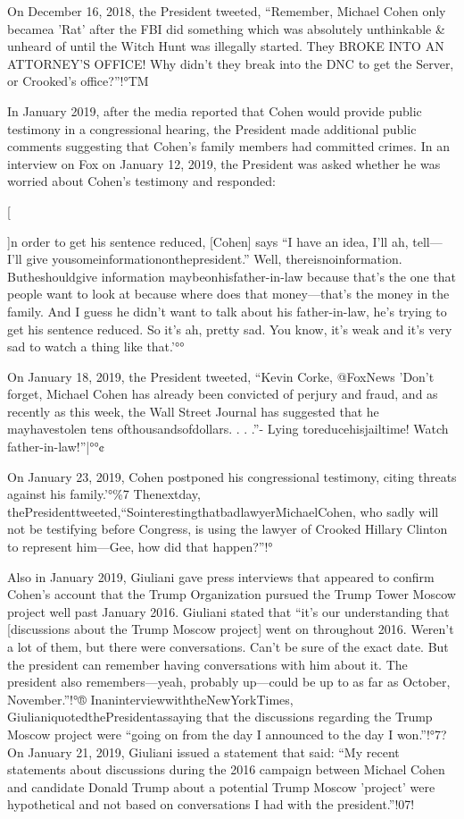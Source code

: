 On December 16, 2018, the President tweeted, “Remember, Michael Cohen only becamea 'Rat' after the FBI did something which was absolutely unthinkable \& unheard of until the Witch Hunt was illegally started.
They BROKE INTO AN ATTORNEY'S OFFICE!
Why didn't they break into the DNC to get the Server, or Crooked's office?”!°TM

In January 2019, after the media reported that Cohen would provide public testimony in a congressional hearing, the President made additional public comments suggesting that Cohen's family members had committed crimes.
In an interview on Fox on January 12, 2019, the President was asked whether he was worried about Cohen's testimony and responded:

[{]n order to get his sentence reduced, [Cohen] says “I have an idea, I'll ah, tell—I'll give yousomeinformationonthepresident.”
Well, thereisnoinformation.
Butheshouldgive information maybeonhisfather-in-law because that's the one that people want to look at because where does that money—that's the money in the family.
And I guess he didn't want to talk about his father-in-law, he's trying to get his sentence reduced.
So it's ah, pretty sad.
You know, it's weak and it's very sad to watch a thing like that.'°°

On January 18, 2019, the President tweeted, “Kevin Corke, @FoxNews 'Don't forget, Michael Cohen has already been convicted of perjury and fraud, and as recently as this week, the Wall Street Journal has suggested that he mayhavestolen tens ofthousandsofdollars. . . .”- Lying toreducehisjailtime! Watch father-in-law!”|°°¢

On January 23, 2019, Cohen postponed his congressional testimony, citing threats against his family.'°\%7
Thenextday, thePresidenttweeted,“SointerestingthatbadlawyerMichaelCohen, who sadly will not be testifying before Congress, is using the lawyer of Crooked Hillary Clinton to represent him—Gee, how did that happen?”!°%

Also in January 2019, Giuliani gave press interviews that appeared to confirm Cohen's account that the Trump Organization pursued the Trump Tower Moscow project well past January 2016.
Giuliani stated that “it's our understanding that [discussions about the Trump Moscow project] went on throughout 2016.
Weren't a lot of them, but there were conversations.
Can't be sure of the exact date.
But the president can remember having conversations with him about it.
The president also remembers—yeah, probably up—could be up to as far as October, November.”!°®
InaninterviewwiththeNewYorkTimes, GiulianiquotedthePresidentassaying that the discussions regarding the Trump Moscow project were “going on from the day I announced to the day I won.”!°7?
On January 21, 2019, Giuliani issued a statement that said: “My recent statements about discussions during the 2016 campaign between Michael Cohen and candidate Donald Trump about a potential Trump Moscow 'project' were hypothetical and not based on conversations I had with the president.”!07!

}
